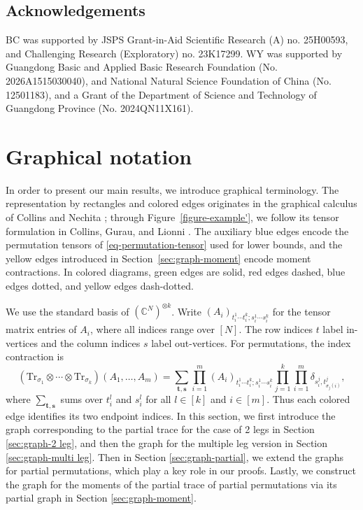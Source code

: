 \documentclass[12pt]{article}
\numberwithin{equation}{section}
\theoremstyle{plain}
\def\bC{\mathbb C}
\def\Tr{\mathrm {Tr}}
\begin{document}
\subsection*{Acknowledgements}

BC was supported by JSPS Grant-in-Aid Scientific Research (A) no. 25H00593, and Challenging Research (Exploratory) no. 23K17299.
WY was supported by Guangdong Basic and Applied Basic Research Foundation (No. 2026A1515030040), and National Natural Science Foundation of China (No. 12501183), and a Grant of the Department of Science and Technology of Guangdong Province (No. 2024QN11X161).

\section{Graphical notation} \label{sec:graph}

In order to present our main results, we introduce graphical terminology. The representation by rectangles and colored edges originates in the graphical calculus of Collins and Nechita \cite{CN2010}; through Figure~\ref{figure-example'}, we follow its tensor formulation in Collins, Gurau, and Lionni \cite{MR4604905}. The auxiliary blue edges encode the permutation tensors of \eqref{eq-permutation-tensor} used for lower bounds, and the yellow edges introduced in Section~\ref{sec:graph-moment} encode moment contractions. In colored diagrams, green edges are solid, red edges dashed, blue edges dotted, and yellow edges dash-dotted.

We use the standard basis of $(\bC^N)^{\otimes k}$. Write
$(A_i)_{t_i^1\cdots t_i^k;s_i^1\cdots s_i^k}$ for the tensor matrix entries of $A_i$, where all indices range over $[N]$. The row indices $t$ label in-vertices and the column indices $s$ label out-vertices. For permutations, the index contraction is
\begin{equation}\label{eq-coordinate-trace}
(\Tr_{\sigma_1}\otimes\cdots\otimes\Tr_{\sigma_k})(A_1,\ldots,A_m)
=\sum_{\mathbf t,\mathbf s}
\prod_{i=1}^m (A_i)_{t_i^1\cdots t_i^k;s_i^1\cdots s_i^k}
\prod_{j=1}^k\prod_{i=1}^m\delta_{s_i^j,t_{\sigma_j(i)}^j},
\end{equation}
where $\sum_{\mathbf t,\mathbf s}$ sums over $t_i^l$ and $s_i^l$ for all $l \in [k]$ and $i \in [m]$.
Thus each colored edge identifies its two endpoint indices.
In this section, we first introduce the graph corresponding to the partial trace for the case of 2 legs in Section \ref{sec:graph-2 leg}, and then the graph for the multiple leg version in Section \ref{sec:graph-multi leg}.
Then in Section \ref{sec:graph-partial}, we extend the graphs for partial permutations, which play a key role in our proofs.
Lastly, we construct the graph for the moments of the partial trace of partial permutations via its partial graph in Section \ref{sec:graph-moment}.
\end{document}
